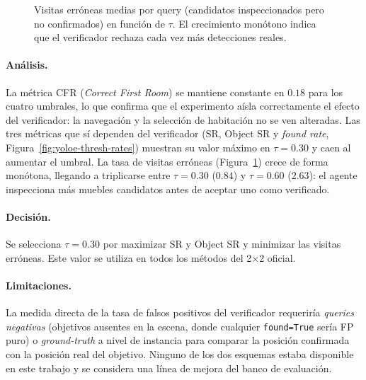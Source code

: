\documentclass[11pt,a4paper]{article}
\begin{document}
\begin{figure}[h]
\centering
{}
\caption{Visitas erróneas medias por query (candidatos inspeccionados pero
no confirmados) en función de $\tau$. El crecimiento monótono indica que el
verificador rechaza cada vez más detecciones reales.}
\label{fig:yoloe-thresh-wrong}
\end{figure}

\paragraph{Análisis.}
La métrica CFR (\emph{Correct First Room}) se mantiene constante en $0.18$ para
los cuatro umbrales, lo que confirma que el experimento aísla correctamente el
efecto del verificador: la navegación y la selección de habitación no se ven
alteradas. Las tres métricas que sí dependen del verificador (SR, Object SR y
\emph{found rate}, Figura~\ref{fig:yoloe-thresh-rates}) muestran su valor
máximo en $\tau=0.30$ y caen al aumentar el umbral. La tasa de visitas erróneas
(Figura~\ref{fig:yoloe-thresh-wrong}) crece de forma monótona, llegando a
triplicarse entre $\tau=0.30$ ($0.84$) y $\tau=0.60$ ($2.63$): el agente
inspecciona más muebles candidatos antes de aceptar uno como verificado.

\paragraph{Decisión.}
Se selecciona $\tau=0.30$ por maximizar SR y Object SR y minimizar las visitas
erróneas. Este valor se utiliza en todos los métodos del 2$\times$2 oficial.

\paragraph{Limitaciones.}
La medida directa de la tasa de falsos positivos del verificador requeriría
\emph{queries negativas} (objetivos ausentes en la escena, donde cualquier
\texttt{found=True} sería FP puro) o \emph{ground-truth} a nivel de instancia
para comparar la posición confirmada con la posición real del objetivo.
Ninguno de los dos esquemas estaba disponible en este trabajo y se considera
una línea de mejora del banco de evaluación.
\end{document}
